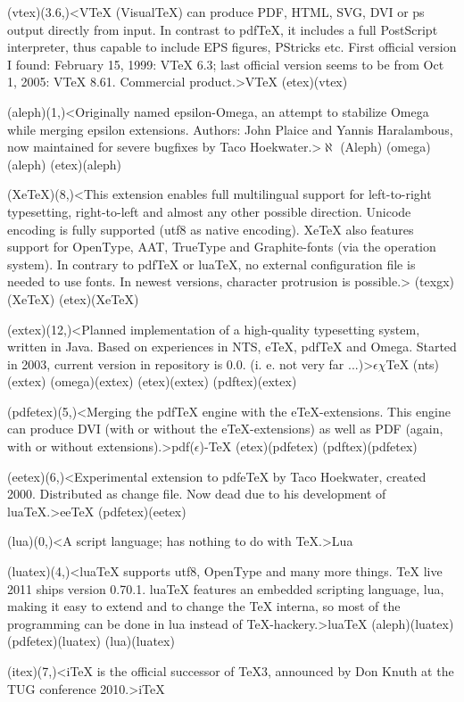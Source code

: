 {	\tonode[\experimental](vtex)(3.6,\layer)<VTeX (VisualTeX) can produce PDF, HTML, SVG, DVI or ps output directly from input. In contrast to pdfTeX, it includes a full PostScript interpreter, thus capable to include EPS figures, PStricks etc. First official version I found: February 15, 1999: VTeX 6.3; last official version seems to be from Oct 1, 2005: VTeX 8.61. Commercial product.>{V\TeX}
	\todraw(etex)(vtex)
	
	\steplayer[-2]
	\tonode[\experimental](aleph)(1,\layer)<Originally named epsilon-Omega, an attempt to stabilize Omega while merging epsilon extensions. Authors: John Plaice and Yannis Haralambous, now maintained for severe bugfixes by Taco Hoekwater.>{$\aleph$ (Aleph)}
	\todraw(omega)(aleph)
	\todraw(etex)(aleph)
	
	\tonode[\vip](XeTeX)(8,\layer)<This extension enables full multilingual support for left-to-right typesetting, right-to-left and almost any other possible direction. Unicode encoding is fully supported (utf8 as native encoding). XeTeX also features support for OpenType, AAT, TrueType and Graphite-fonts (via the operation system). In contrary to pdfTeX or luaTeX, no external configuration file is needed to use fonts. In newest versions, character protrusion is possible.>{\XeTeX}
	\todraw(texgx)(XeTeX)
	\todraw*(etex)(XeTeX)
	
	\tonode[\experimental](extex)(12,\layer)<Planned implementation of a high-quality typesetting system, written in Java. Based on experiences in NTS, eTeX, pdfTeX and Omega. Started in 2003, current version in repository is 0.0. (i. e. not very far ...)>{$\epsilon\chi$\TeX}
	\todraw(nts)(extex)
	\todraw(omega)(extex)
	\todraw(etex)(extex)
	\todraw(pdftex)(extex)
	
	\tonode[\vip](pdfetex)(5,\layer)<Merging the pdfTeX engine with the eTeX-extensions. This engine can produce DVI (with or without the eTeX-extensions) as well as PDF (again, with or without extensions).>{pdf($\epsilon$)-\TeX}
	\todraw*(etex)(pdfetex)
	\todraw*(pdftex)(pdfetex)
	
	\steplayer[-2]
	\tonode[\experimental](eetex)(6,\layer)<Experimental extension to pdfeTeX by Taco Hoekwater, created 2000. Distributed as change file. Now dead due to his development of luaTeX.>{ee\TeX}
	\todraw(pdfetex)(eetex)
	
	\steplayer[-2]
	\tonode[\program](lua)(0,\layer)<A script language; has nothing to do with TeX.>{Lua}
	
	\tonode[\vip](luatex)(4,\layer)<luaTeX supports utf8, OpenType and many more things. TeX live 2011 ships version 0.70.1. luaTeX features an embedded scripting language, lua, making it easy to extend and to change the TeX interna, so most of the programming can be done in lua instead of TeX-hackery.>{lua\TeX}
	\todraw(aleph)(luatex)
	\todraw*(pdfetex)(luatex)
	\todraw[dashed](lua)(luatex)
	
	\steplayer[-2]
	\tonode[\experimental](itex)(7,\layer)<iTeX is the official successor of TeX3, announced by Don Knuth at the TUG conference 2010.>{i\TeX}
}

